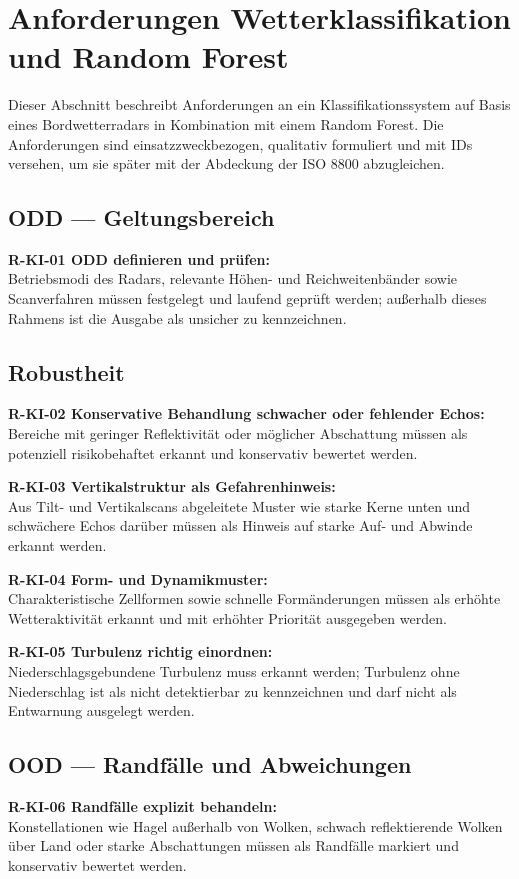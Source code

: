 \section{Anforderungen Wetterklassifikation und Random Forest}
\label{sec:req-radar-ki}

Dieser Abschnitt beschreibt Anforderungen an ein Klassifikationssystem auf Basis eines Bordwetterradars in Kombination 
mit einem Random Forest. Die Anforderungen sind einsatzzweckbezogen, qualitativ formuliert 
und mit IDs versehen, um sie später mit der Abdeckung der ISO 8800 abzugleichen.

\subsection*{ODD — Geltungsbereich}
\textbf{R-KI-01 ODD definieren und prüfen:} \\
Betriebsmodi des Radars, relevante Höhen- und Reichweitenbänder sowie Scanverfahren müssen festgelegt und laufend geprüft werden; außerhalb dieses Rahmens ist die Ausgabe als unsicher zu kennzeichnen.

\subsection*{Robustheit}
\textbf{R-KI-02 Konservative Behandlung schwacher oder fehlender Echos:}\\
Bereiche mit geringer Reflektivität oder möglicher Abschattung müssen als potenziell risikobehaftet erkannt und konservativ bewertet werden.

\textbf{R-KI-03 Vertikalstruktur als Gefahrenhinweis:} \\
Aus Tilt- und Vertikalscans abgeleitete Muster wie starke Kerne unten und schwächere Echos darüber müssen als Hinweis auf starke Auf- und Abwinde erkannt werden.

\textbf{R-KI-04 Form- und Dynamikmuster:} \\
Charakteristische Zellformen sowie schnelle Formänderungen müssen als erhöhte Wetteraktivität erkannt und mit erhöhter Priorität ausgegeben werden.

\textbf{R-KI-05 Turbulenz richtig einordnen:} \\
Niederschlagsgebundene Turbulenz muss erkannt werden; Turbulenz ohne Niederschlag ist als nicht detektierbar zu kennzeichnen und darf nicht als Entwarnung ausgelegt werden.

\subsection*{OOD — Randfälle und Abweichungen}
\textbf{R-KI-06 Randfälle explizit behandeln:} \\
Konstellationen wie Hagel außerhalb von Wolken, schwach reflektierende Wolken über Land oder starke Abschattungen müssen als Randfälle markiert und konservativ bewertet werden.

